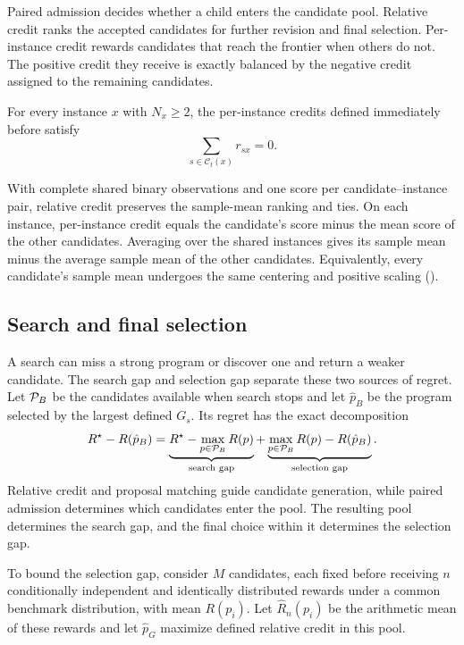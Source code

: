 Paired admission decides whether a child enters the candidate pool.  Relative
credit ranks the accepted candidates for further revision and final selection.
Per-instance credit rewards candidates that reach the frontier when others do
not.  The positive credit they receive is exactly balanced by the negative
credit assigned to the remaining candidates.

\begin{proposition}
\label{prop:credit_conservation}
For every instance $x$ with $N_x\ge2$, the per-instance credits defined immediately
before  satisfy
\[
\sum_{s\in\mathcal C_t(x)}r_{sx}=0.
\]
\end{proposition}

With complete shared binary observations and one score per
candidate--instance pair, relative credit preserves the sample-mean ranking
and ties.  On each instance, per-instance credit equals the candidate's score
minus the mean score of the other candidates.  Averaging over the shared
instances gives its sample mean minus the average sample mean of the other
candidates.  Equivalently, every candidate's sample mean undergoes the same
centering and positive scaling ().

\subsection{Search and final selection}
\label{sec:search_selection}

A search can miss a strong program or discover one and return a weaker
candidate.  The search gap and selection gap separate these two sources of
regret.  Let $\mathcal{P}_B$ be the candidates available when search stops and let
$\hat p_B$ be the program selected by the largest defined $G_s$.  Its regret
has the exact decomposition
\begin{equation}
R^\star-R(\hat p_B)
=
\underbrace{R^\star-\max_{p\in\mathcal{P}_B}R(p)}_{\text{search gap}}
+
\underbrace{\max_{p\in\mathcal{P}_B}R(p)-R(\hat p_B)}_{\text{selection gap}}.
\label{eq:terminal_regret_decomposition}
\end{equation}
Relative credit and proposal matching guide candidate generation, while paired
admission determines which candidates enter the pool.  The resulting pool
determines the search gap, and the final choice within it determines the
selection gap.

To bound the selection gap, consider $M$ candidates, each fixed before receiving
$n$ conditionally independent and identically distributed rewards under a
common benchmark distribution, with mean $R(p_i)$.  Let $\widehat R_n(p_i)$ be the
arithmetic mean of these rewards and let $\widehat p_G$ maximize defined relative
credit in this pool.

